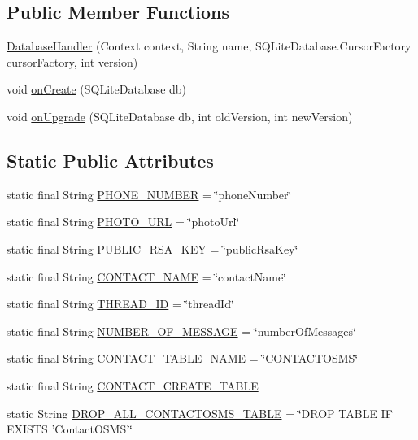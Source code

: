 \subsection*{Public Member Functions}
\begin{DoxyCompactItemize}
\item 
\hyperlink{a00010_af285ad62cfa52e0aed3af7dec15a8c23}{Database\+Handler} (Context context, String name, S\+Q\+Lite\+Database.\+Cursor\+Factory cursor\+Factory, int version)
\item 
void \hyperlink{a00010_a98b247cd7e075d076b0364beee305621}{on\+Create} (S\+Q\+Lite\+Database db)
\item 
void \hyperlink{a00010_a47418a2bb9896d8cd648b4094755e6c7}{on\+Upgrade} (S\+Q\+Lite\+Database db, int old\+Version, int new\+Version)
\end{DoxyCompactItemize}
\subsection*{Static Public Attributes}
\begin{DoxyCompactItemize}
\item 
static final String \hyperlink{a00010_ab82e52128049364660302a3d290f21ff}{P\+H\+O\+N\+E\+\_\+\+N\+U\+M\+B\+E\+R} = \char`\"{}phone\+Number\char`\"{}
\item 
static final String \hyperlink{a00010_a8e08c45856be8a38b4ba9db84b11fa44}{P\+H\+O\+T\+O\+\_\+\+U\+R\+L} = \char`\"{}photo\+Url\char`\"{}
\item 
static final String \hyperlink{a00010_a441e33a0577b5591c0885e4f8f2454f3}{P\+U\+B\+L\+I\+C\+\_\+\+R\+S\+A\+\_\+\+K\+E\+Y} = \char`\"{}public\+Rsa\+Key\char`\"{}
\item 
static final String \hyperlink{a00010_abf69678c3e436dd320bb4322175b1eb1}{C\+O\+N\+T\+A\+C\+T\+\_\+\+N\+A\+M\+E} = \char`\"{}contact\+Name\char`\"{}
\item 
static final String \hyperlink{a00010_a28a7594753498b2109f8b5203f176890}{T\+H\+R\+E\+A\+D\+\_\+\+I\+D} = \char`\"{}thread\+Id\char`\"{}
\item 
static final String \hyperlink{a00010_aa3941d45d50130c8c709965c7763429d}{N\+U\+M\+B\+E\+R\+\_\+\+O\+F\+\_\+\+M\+E\+S\+S\+A\+G\+E} = \char`\"{}number\+Of\+Messages\char`\"{}
\item 
static final String \hyperlink{a00010_a23f7383bb6a2bb7dc52d5c6366093d70}{C\+O\+N\+T\+A\+C\+T\+\_\+\+T\+A\+B\+L\+E\+\_\+\+N\+A\+M\+E} = \char`\"{}C\+O\+N\+T\+A\+C\+T\+O\+S\+M\+S\char`\"{}
\item 
static final String \hyperlink{a00010_a2ba8d9afb3e24e566831ab37cfd1cb66}{C\+O\+N\+T\+A\+C\+T\+\_\+\+C\+R\+E\+A\+T\+E\+\_\+\+T\+A\+B\+L\+E}
\item 
static String \hyperlink{a00010_ada3f8d3110ee9db3cb69c47010ed7b70}{D\+R\+O\+P\+\_\+\+A\+L\+L\+\_\+\+C\+O\+N\+T\+A\+C\+T\+O\+S\+M\+S\+\_\+\+T\+A\+B\+L\+E} = \char`\"{}D\+R\+O\+P T\+A\+B\+L\+E I\+F E\+X\+I\+S\+T\+S 'Contact\+O\+S\+M\+S'\char`\"{}
\end{DoxyCompactItemize}


